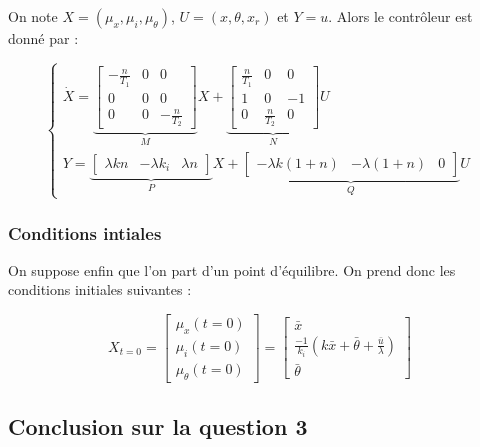 \documentclass[10pt]{article}
\begin{document}
\vspace{10px}

\noindent On note $X = (\mu_x, \mu_i, \mu_\theta)$, $U = (x, \theta, x_r)$ et $Y = u$. Alors le contrôleur est donné par :

\[
	\begin{cases}
		\dot X =
		\underbrace{
		\begin{bmatrix}
			- \frac{n}{T_1} & 0 & 0 \\
			0 & 0 & 0 \\
			0 & 0 & - \frac{n}{T_2}
		\end{bmatrix}
		}_{M} X +
		\underbrace{
		\begin{bmatrix}
			\frac{n}{T_1} & 0 & 0 \\
			1 & 0 & -1 \\
			0 & \frac{n}{T_2} & 0
		\end{bmatrix}
		}_{N} U \\
		Y = \underbrace{
		\begin{bmatrix}
			\lambda k n &  - \lambda k_i & \lambda n
		\end{bmatrix}
		}_{P} X +
		\underbrace{
		\begin{bmatrix}
			- \lambda k (1 + n) &- \lambda (1 + n) & 0
		\end{bmatrix}
		}_{Q} U
	\end{cases}
\]

\subsubsection*{Conditions intiales}

\noindent On suppose enfin que l'on part d'un point d'équilibre. On prend donc les conditions initiales suivantes :

\[
	X_{t = 0} = \begin{bmatrix}
		\mu_x (t = 0) \\
		\mu_i (t = 0) \\
		\mu_\theta (t = 0)
	\end{bmatrix}
	= \begin{bmatrix}
		\bar x \\
		\frac{-1}{k_i} ( k \bar x + \bar \theta +\frac{\bar u}{\lambda}  ) \\
		\bar \theta
	\end{bmatrix}
\]

\subsection*{Conclusion sur la question 3}
\end{document}
